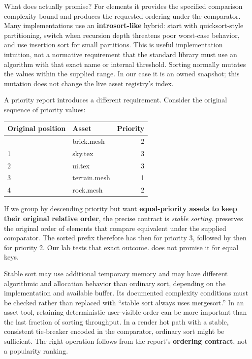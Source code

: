 What does  actually promise? For  elements it provides the specified comparison complexity bound and produces the requested ordering under the comparator. Many implementations use an \textbf{introsort-like} hybrid: start with quicksort-style partitioning, switch when recursion depth threatens poor worst-case behavior, and use insertion sort for small partitions. This is useful implementation intuition, not a normative requirement that the standard library must use an algorithm with that exact name or internal threshold. Sorting normally mutates the values within the supplied range. In our case it is an owned snapshot; this mutation does not change the live asset registry's index.

A priority report introduces a different requirement. Consider the original sequence of priority values:

{\def\LTcaptype{none} %
\begin{longtable}[]{@{}llr@{}}
\toprule\noalign{}
Original position & Asset & Priority \\
\midrule\noalign{}
\endhead
\bottomrule\noalign{}
\endlastfoot
0 & brick.mesh & 2 \\
1 & sky.tex & 3 \\
2 & ui.tex & 3 \\
3 & terrain.mesh & 1 \\
4 & rock.mesh & 2 \\
\end{longtable}
}

If we group by descending priority but want \textbf{equal-priority assets to keep their original relative order}, the precise contract is \emph{stable sorting}.  preserves the original order of elements that compare equivalent under the supplied comparator. The sorted prefix therefore has  then  for priority 3, followed by  then  for priority 2. Our lab tests that exact outcome.  does not promise it for equal keys.

Stable sort may use additional temporary memory and may have different algorithmic and allocation behavior than ordinary sort, depending on the implementation and available buffer. Its documented complexity conditions must be checked rather than replaced with ``stable sort always uses mergesort.'' In an asset tool, retaining deterministic user-visible order can be more important than the last fraction of sorting throughput. In a render hot path with a stable, consistent tie-breaker encoded in the comparator, ordinary sort might be sufficient. The right operation follows from the report's \textbf{ordering contract}, not a popularity ranking.

